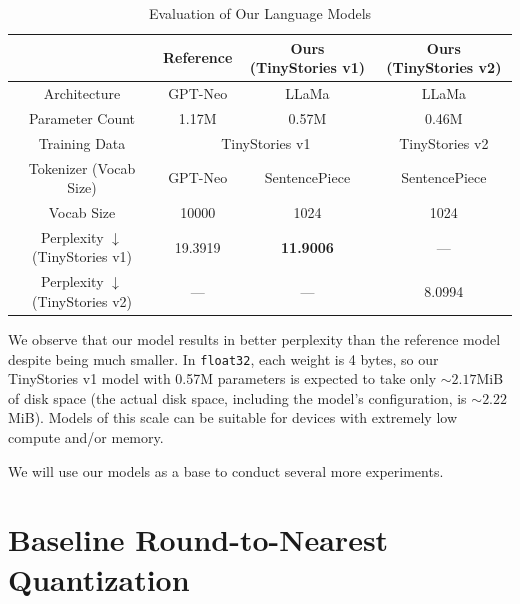 \documentclass[../main.tex]{subfiles}
\begin{document}
\begin{table}[H]
\centering
\caption{Evaluation of Our Language Models}
\label{tab:our_models_eval}
\begin{tabular}{|c|cc|c|}
\hline
                                       & \multicolumn{1}{c|}{Reference}        & Ours (TinyStories v1) & Ours (TinyStories v2) \\ \hline
Architecture                           & \multicolumn{1}{c|}{GPT-Neo}          & LLaMa                 & LLaMa                 \\ \hline
Parameter Count                          & \multicolumn{1}{c|}{1.17M}            & 0.57M                 & 0.46M                 \\ \hline
Training Data                                   & \multicolumn{2}{c|}{TinyStories v1}                  & TinyStories v2        \\ \hline
Tokenizer (Vocab Size)                 & \multicolumn{1}{c|}{GPT-Neo}          & SentencePiece                & SentencePiece                \\ \hline
Vocab Size                             & \multicolumn{1}{c|}{10000}            & 1024                  & 1024                  \\ \hline
Perplexity $\downarrow$ (TinyStories v1) & \multicolumn{1}{c|}{19.3919} & \textbf{11.9006}      & ---                   \\ \hline
Perplexity $\downarrow$ (TinyStories v2)& \multicolumn{1}{c|}{---}              & ---                   & 8.0994                \\ \hline
\end{tabular}
\end{table}


We observe that our model results in better perplexity than the reference model despite being much smaller. In \verb|float32|, each weight is 4 bytes, so our TinyStories v1 model with 0.57M parameters is expected to take only $\sim2.17$MiB of disk space (the actual disk space, including the model's configuration, is $\sim2.22$MiB). Models of this scale can be suitable for devices with extremely low compute and/or memory.

We will use our models as a base to conduct several more experiments.

\section{Baseline Round-to-Nearest Quantization} \label{sec:rtn}
\end{document}
